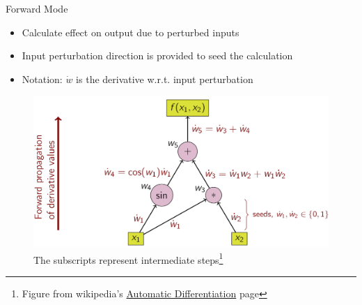 \documentclass[12pt]{beamer}
\renewcommand{\d}[1]{\dot{#1}}
\newcommand{\fn}[1]{\footnote{\footnotesize #1}}
\begin{document}
  \begin{frame}{Forward Mode}
    \begin{itemize}
      \item Calculate effect on output due to perturbed inputs
      \item Input perturbation direction is provided to seed the calculation
      \item Notation: $\d{w}$ is the derivative w.r.t. input perturbation
    \end{itemize}
    
    \begin{figure}[h!]
      \centering
      \includegraphics[height=.5\textheight]{forwardMode}
      \caption{The subscripts represent intermediate steps\fn{Figure from wikipedia's \href{http://en.wikipedia.org/wiki/Automatic_differentiation}{Automatic Differentiation} page}}
    \end{figure}

  \end{frame}
\end{document}
